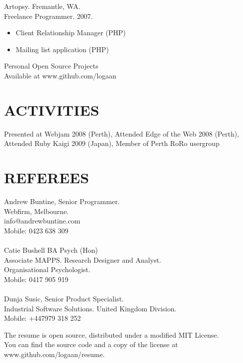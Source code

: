 \documentclass[margin]{res}
\begin{document}
\begin{resume}
   Artopsy. Fremantle, WA. \\
    Freelance Programmer. 2007.
 \begin{itemize}
  \item Client Relationship Manager (PHP)
  \item Mailing list application (PHP)
  \end{itemize} 

  Personal Open Source Projects \\
  Available at www.github.com/logaan

  \section{ACTIVITIES}
  Presented at Webjam 2008 (Perth), Attended Edge of the Web 2008 (Perth), Attended
  Ruby Kaigi 2009 (Japan), Member of Perth RoRo usergroup
  
  \section{REFEREES}
  Andrew Buntine, Senior Programmer. \\
  Webfirm, Melbourne. \\
  info@andrewbuntine.com \\
  Mobile: 0423 638 309 \\
  \\
  Catie Bushell BA Psych (Hon) \\
  Associate MAPPS. Research Designer and Analyst. \\
  Organisational Psychologist. \\
  Mobile: 0417 905 919 \\
  \\
  Dunja Susic, Senior Product Specialist. \\
  Industrial Software Solutions. United Kingdom Division. \\
  Mobile: +447979 318 252 \\
  
\end{resume} 

\centering
\hspace{-1.75in}  The resume is open source, distributed under a modified MIT License. \\
\hspace{-1.75in}  You can find the source code and a copy of the license at www.github.com/logaan/resume.
\end{document}
